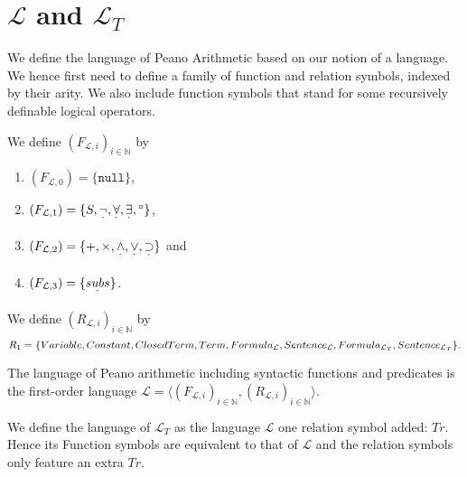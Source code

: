 \section{$\mathcal{L}$ and $\mathcal{L}_T$}\label{subsec:lpa-lt}
We define the language of Peano Arithmetic based on our notion of a language. We hence first need to define a family of function and relation symbols, indexed by their arity. We also include function symbols that stand for some recursively definable logical operators.

\begin{definition}\label{def:L-Func}
  \leanok
  We define $(F_{\mathcal{L},i})_{i \in \mathbb{N}}$ by
  \begin{enumerate}
  \item $(F_{\mathcal{L},0}) = \{\texttt{null}\}$,
  \item $(F_{\mathcal{L},1}) = \{S, \underset{^{\boldsymbol{\cdot}}}{\neg} , \underset{^{\boldsymbol{\cdot}}}{\forall}, \underset{^{\boldsymbol{\cdot}}}{\exists}, {^\circ}\}$,
  \item $(F_{\mathcal{L},2}) = \{+,\times, \underset{^{\boldsymbol{\cdot}}}{\wedge}, \underset{^{\boldsymbol{\cdot}}}{\vee}, \underset{^{\boldsymbol{\cdot}}}{\supset}\}$ and
  \item $(F_{\mathcal{L},3}) = \{\underset{^{\boldsymbol{\cdot}}}{subs}\}$.
  \end{enumerate}
\end{definition}

\begin{definition}\label{def:L-Rel}
  \leanok
  We define $(R_{\mathcal{L},i})_{i \in \mathbb{N}}$ by \[R_1 = \{Variable, Constant, ClosedTerm, Term, Formula_{\mathcal{L}}, Sentence_{\mathcal{L}}, \\ Formula_{\mathcal{L}_T}, Sentence_{\mathcal{L}_T}\}.\]
\end{definition}

\begin{definition}\label{def:L}
  \leanok
    The language of Peano arithmetic including syntactic functions and predicates is the first-order language $\mathcal{L} = \langle (F_{\mathcal{L},i})_{i \in \mathbb{N}}, (R_{\mathcal{L},i})_{i \in \mathbb{N}} \rangle$.
\end{definition}

We define the language of $\mathcal{L}_T$ as the language $\mathcal{L}$ one relation symbol added: $Tr$. Hence its Function symbols are equivalent to that of $\mathcal{L}$ and the relation symbols only feature an extra $Tr$.

